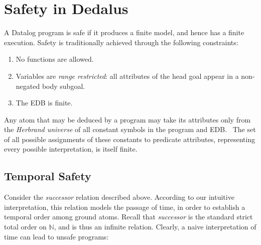\section{Safety in Dedalus}

A Datalog program is safe if it produces a finite model, and hence has a finite
execution.  Safety is traditionally achieved through the following constraints:

\begin{enumerate}
%
\item No functions are allowed. 
%
\item Variables are \emph{range restricted}: all attributes of the head goal
appear in a non-negated body subgoal.
%
\item The EDB is finite.
%
\end{enumerate}

Any atom that may be deduced by a program may take its attributes only from the \emph{Herbrand universe} of
all constant symbols in the program and EDB.~
The set of all possible assignments of these constants to predicate attributes,
representing every possible interpretation, is itself finite. 


\subsection{Temporal Safety}

Consider the \emph{successor} relation described above.  According to our intuitive interpretation, this relation models
the passage of time, in order to establish a temporal order among ground atoms.  
Recall that {\em successor} is the standard strict total order on $\mathbb{N}$,
and is thus an infinite relation.  Clearly, a naive interpretation of time can
lead to unsafe programs:



